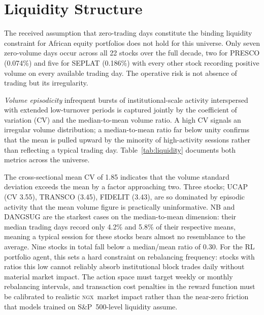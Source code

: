 \documentclass[twoside,11pt]{article}
\newcommand{\ngx}{\textsc{ngx}}
\newcommand{\spidx}{S\&P~500}
\begin{document}
	\section{Liquidity Structure}
	\label{sec:liquidity}
	
	The received assumption that zero-trading days constitute the binding	liquidity constraint for African equity portfolios does not hold for this universe. Only seven zero-volume days occur across all 22 stocks over the full decade, two for PRESCO (0.074\%) and five for SEPLAT
	(0.186\%) with every other stock recording positive volume on every available trading day. The operative risk is not absence of trading but its irregularity.
	
	\emph{Volume episodicity} infrequent bursts of institutional-scale	activity interspersed with extended low-turnover periods is	captured jointly by the coefficient of variation (CV) and the median-to-mean volume ratio. A high CV signals an irregular volume
	distribution; a median-to-mean ratio far below unity confirms that the mean is pulled upward by the minority of high-activity sessions rather than reflecting a typical trading day. Table~\ref{tab:liquidity}
	documents both metrics across the universe.
	
	The cross-sectional mean CV of 1.85 indicates that the volume standard deviation exceeds the mean by a factor approaching two. Three stocks; UCAP (CV 3.55), TRANSCO (3.45), FIDELIT (3.43),	are so dominated by episodic activity that the mean volume figure is practically uninformative. NB and DANGSUG are the starkest cases on
	the median-to-mean dimension: their median trading days record only	4.2\% and 5.8\% of their respective means, meaning a typical session for these stocks bears almost no resemblance to the average. Nine	stocks in total fall below a median/mean ratio of 0.30. For the RL portfolio agent, this sets a hard constraint on rebalancing frequency: stocks with ratios this low cannot reliably absorb institutional block trades daily without material market impact. The action space must target weekly or monthly rebalancing intervals, and transaction cost penalties in the reward function must be calibrated to realistic \ngx\ market impact rather than the near-zero friction that models trained on \spidx-level liquidity assume.
	 
\end{document}
